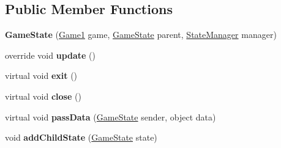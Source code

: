 \subsection*{Public Member Functions}
\begin{DoxyCompactItemize}
\item 
\hypertarget{class_simple_r_p_g_1_1_states_1_1_game_state_a0739c91318628b0180c6039558fdaf59}{{\bfseries Game\-State} (\hyperlink{class_simple_r_p_g_1_1_game1}{Game1} game, \hyperlink{class_simple_r_p_g_1_1_states_1_1_game_state}{Game\-State} parent, \hyperlink{class_simple_r_p_g_1_1_states_1_1_state_manager}{State\-Manager} manager)}\label{class_simple_r_p_g_1_1_states_1_1_game_state_a0739c91318628b0180c6039558fdaf59}

\item 
\hypertarget{class_simple_r_p_g_1_1_states_1_1_game_state_ac89d802264bde3ba8d889375f413e4ea}{override void {\bfseries update} ()}\label{class_simple_r_p_g_1_1_states_1_1_game_state_ac89d802264bde3ba8d889375f413e4ea}

\item 
\hypertarget{class_simple_r_p_g_1_1_states_1_1_game_state_a52586b02847099e993bb3acd30f996a5}{virtual void {\bfseries exit} ()}\label{class_simple_r_p_g_1_1_states_1_1_game_state_a52586b02847099e993bb3acd30f996a5}

\item 
\hypertarget{class_simple_r_p_g_1_1_states_1_1_game_state_ac9a596081d4da5d8d5a27139e3fb97fa}{virtual void {\bfseries close} ()}\label{class_simple_r_p_g_1_1_states_1_1_game_state_ac9a596081d4da5d8d5a27139e3fb97fa}

\item 
\hypertarget{class_simple_r_p_g_1_1_states_1_1_game_state_aec6e20917880e857868ac584906515c6}{virtual void {\bfseries pass\-Data} (\hyperlink{class_simple_r_p_g_1_1_states_1_1_game_state}{Game\-State} sender, object data)}\label{class_simple_r_p_g_1_1_states_1_1_game_state_aec6e20917880e857868ac584906515c6}

\item 
\hypertarget{class_simple_r_p_g_1_1_states_1_1_game_state_a2a3a4da7363acb938403f669517b9de0}{void {\bfseries add\-Child\-State} (\hyperlink{class_simple_r_p_g_1_1_states_1_1_game_state}{Game\-State} state)}\label{class_simple_r_p_g_1_1_states_1_1_game_state_a2a3a4da7363acb938403f669517b9de0}

\end{DoxyCompactItemize}
